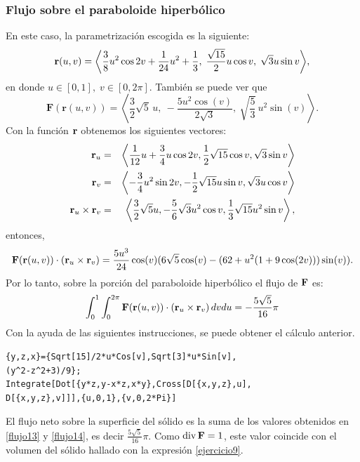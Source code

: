 \begin{parrafonumerado}
\subsubsection{Flujo sobre el paraboloide hiperbólico}

En este caso, la parametrización escogida es la siguiente:
\[
{\bf r}(u,v) =
\left\langle
\frac{3}{8}u^{2}\cos 2v + \frac{1}{24}u^{2} + \frac{1}{3},\;
\frac{\sqrt{15}}{2}u\cos v,\;
\sqrt{3}u\sin v
\right\rangle\!,
\]
en donde \( u \in [0,1],\; v \in [0,2\pi] \). También se puede ver que
\[
\mathbf{F}(\mathbf{r}(u,v)) =
\left\langle
\frac{3}{2}\sqrt{5}\,u,\
-\frac{5u^2\cos(v)}{2\sqrt{3}},\
\sqrt{\frac{5}{3}}\, u^2 \sin(v)
\right\rangle\!.
\]
Con la función ${\bf r}$ obtenemos los siguientes vectores:
\begin{eqnarray*}
{\bf r}_{u} &=&\left\langle \frac{1}{12}u+\frac{3}{4}u\cos 2v,\frac{1}{2}\sqrt{15}\cos v,\sqrt{3}\sin v\right\rangle\\
{\bf r}_{v}&=&\left\langle -\frac{3}{4}u^{2}\sin 2v,-\frac{1}{2}\sqrt{15}u\sin v,\sqrt{3}u\cos v\right\rangle \\
{\bf r}_{u}\times {\bf r}_{v}&=& \left \langle \frac{3}{2}\sqrt{5}u,-\frac{5}{6}\sqrt{3} u^{2}\cos v,\frac{1}{3}\sqrt{15}u^{2}\sin v\right \rangle,
\end{eqnarray*}
entonces,
{\small
\[{\bf F}({\bf r}(u,v)) \cdot \left({\bf r}_{u}\times {\bf r}_{v}\right)=\frac{5u^3}{24}\cos(v)(6\sqrt{5}\cos(v)-(62+u^2(1+9\cos(2v)))\sin(v)).\]
}
Por lo tanto, sobre la porción del paraboloide hiperbólico el flujo de ${\bf F}$ es:
\begin{equation} \label{flujo14}
\int_0^1\int_0^{2\pi}{\bf F}({\bf r}(u,v)) \cdot \left({\bf r}_{u}\times{\bf r}_{v}\right)dvdu=-\frac{5 \sqrt{5}}{16}\pi
\end{equation}
Con la ayuda de las siguientes instrucciones, se puede obtener el cálculo anterior.

\begin{tcolorbox}[title=\bf Instrucción \verb"Mathematica"]\begin{Verbatim}[formatcom=\letraverbatim]
{y,z,x}={Sqrt[15]/2*u*Cos[v],Sqrt[3]*u*Sin[v],
(y^2-z^2+3)/9};
Integrate[Dot[{y*z,y-x*z,x*y},Cross[D[{x,y,z},u],
D[{x,y,z},v]]],{u,0,1},{v,0,2*Pi}]
\end{Verbatim}
\end{tcolorbox}

El flujo neto sobre la superficie del sólido es la suma de los valores obtenidos en \ref{flujo13} y
\ref{flujo14}, es decir $\frac{5 \sqrt{5}}{16} \pi$. Como ${\rm div\,}{\bf F}=1$,
este valor coincide con el volumen del sólido hallado con la expresión \ref{ejercicio9}.
\end{parrafonumerado}

